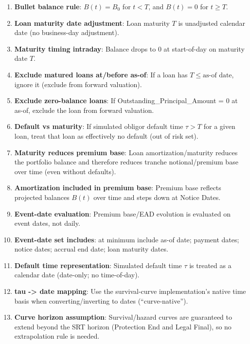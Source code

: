 \documentclass[11pt]{article}
\begin{document}
\begin{enumerate}[label=\arabic*),leftmargin=*,align=left]
\item \textbf{Bullet balance rule}: $B(t) = B_0$ for $t < T$, and $B(t)=0$ for $t \ge T$.

\item \textbf{Loan maturity date adjustment}: Loan maturity $T$ is unadjusted calendar date (no business-day adjustment).

\item \textbf{Maturity timing intraday}: Balance drops to 0 at start-of-day on maturity date $T$.

\item \textbf{Exclude matured loans at/before as-of}: If a loan has $T \le \text{as-of date}$, ignore it (exclude from forward valuation).

\item \textbf{Exclude zero-balance loans}: If Outstanding\_Principal\_Amount = 0 at as-of, exclude the loan from forward valuation.

\item \textbf{Default vs maturity}: If simulated obligor default time $\tau > T$ for a given loan, treat that loan as effectively no default (out of risk set).

\item \textbf{Maturity reduces premium base}: Loan amortization/maturity reduces the portfolio balance and therefore reduces tranche notional/premium base over time (even without defaults).

\item \textbf{Amortization included in premium base}: Premium base reflects projected balances $B(t)$ over time and steps down at Notice Dates.

\item \textbf{Event-date evaluation}: Premium base/EAD evolution is evaluated on event dates, not daily.

\item \textbf{Event-date set includes}: at minimum include as-of date; payment dates; notice dates; accrual end date; loan maturity dates.

\item \textbf{Default time representation}: Simulated default time $\tau$ is treated as a calendar date (date-only; no time-of-day).

\item \textbf{tau -> date mapping}: Use the survival-curve implementation’s native time basis when converting/inverting to dates (“curve-native”).

\item \textbf{Curve horizon assumption}: Survival/hazard curves are guaranteed to extend beyond the SRT horizon (Protection End and Legal Final), so no extrapolation rule is needed.


\end{enumerate}
\end{document}
